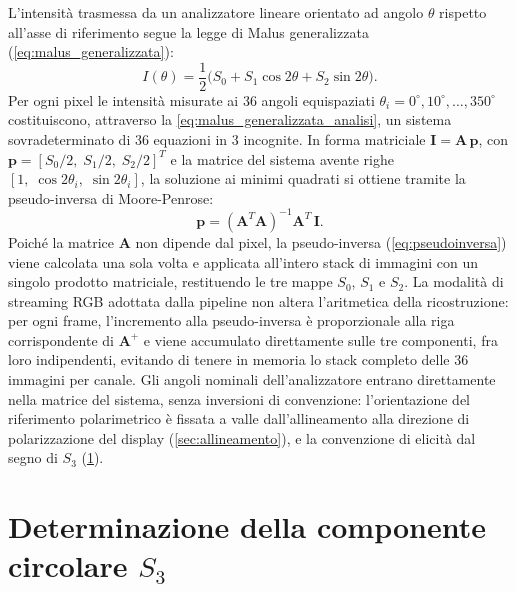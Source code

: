 L'intensità trasmessa da un analizzatore lineare orientato ad angolo $\theta$ rispetto all'asse di riferimento segue la legge di Malus generalizzata (\cref{eq:malus_generalizzata}):
\begin{equation}
    I(\theta) = \frac{1}{2}\bigl(S_0 + S_1 \cos 2\theta + S_2 \sin 2\theta\bigr).
    \label{eq:malus_generalizzata_analisi}
\end{equation}
Per ogni pixel le intensità misurate ai 36 angoli equispaziati $\theta_i = 0^\circ, 10^\circ, \ldots, 350^\circ$ costituiscono, attraverso la \cref{eq:malus_generalizzata_analisi}, un sistema sovradeterminato di 36 equazioni in 3 incognite. In forma matriciale $\mathbf{I} = \mathbf{A}\,\mathbf{p}$, con $\mathbf{p} = [S_0/2,\; S_1/2,\; S_2/2]^T$ e la matrice del sistema avente righe $[1,\; \cos 2\theta_i,\; \sin 2\theta_i]$, la soluzione ai minimi quadrati si ottiene tramite la pseudo-inversa di Moore-Penrose:
\begin{equation}
    \mathbf{p} = (\mathbf{A}^T \mathbf{A})^{-1} \mathbf{A}^T \, \mathbf{I}.
    \label{eq:pseudoinversa}
\end{equation}
Poiché la matrice $\mathbf{A}$ non dipende dal pixel, la pseudo-inversa (\cref{eq:pseudoinversa}) viene calcolata una sola volta e applicata all'intero stack di immagini con un singolo prodotto matriciale, restituendo le tre mappe $S_0$, $S_1$ e $S_2$. La modalità di streaming RGB adottata dalla pipeline non altera l'aritmetica della ricostruzione: per ogni frame, l'incremento alla pseudo-inversa è proporzionale alla riga corrispondente di $\mathbf{A}^+$ e viene accumulato direttamente sulle tre componenti, fra loro indipendenti, evitando di tenere in memoria lo stack completo delle 36 immagini per canale. Gli angoli nominali dell'analizzatore entrano direttamente nella matrice del sistema, senza inversioni di convenzione: l'orientazione del riferimento polarimetrico è fissata a valle dall'allineamento alla direzione di polarizzazione del display (\cref{sec:allineamento}), e la convenzione di elicità dal segno di $S_3$ (\cref{sec:determinazione-s3}).

\section{Determinazione della componente circolare \texorpdfstring{$S_3$}{S3}}
\label{sec:determinazione-s3}

